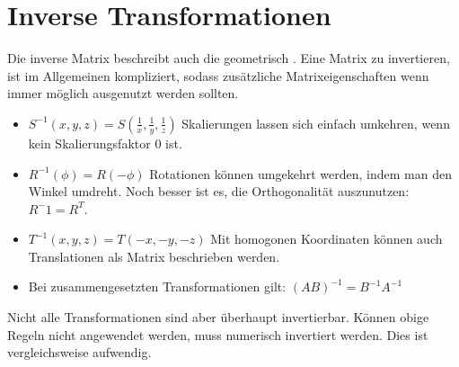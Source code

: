 \section{Inverse Transformationen}
Die inverse Matrix beschreibt auch die geometrisch .
Eine Matrix zu invertieren, ist im Allgemeinen kompliziert, sodass zusätzliche Matrixeigenschaften wenn immer möglich ausgenutzt werden sollten.
\begin{itemize}
  \item $S^{-1}(x, y, z) = S(\frac{1}{x}, \frac{1}{y}, \frac{1}{z})$
  Skalierungen lassen sich einfach umkehren, wenn kein Skalierungsfaktor $0$ ist.
  \item $R^{-1}(\phi) = R(-\phi)$ Rotationen können umgekehrt werden, indem man den Winkel umdreht.
  Noch besser ist es, die Orthogonalität auszunutzen: $R^-1 = R^T$.
  \item $T^{-1}(x, y, z) = T(-x, -y, -z)$
  Mit homogonen Koordinaten können auch Translationen als Matrix beschrieben werden.
  \item Bei zusammengesetzten Transformationen gilt: $(AB)^{-1} = B^{-1}A^{-1}$
\end{itemize}
Nicht alle Transformationen sind aber überhaupt invertierbar.
Können obige Regeln nicht angewendet werden, muss numerisch invertiert werden.
Dies ist vergleichsweise aufwendig.
